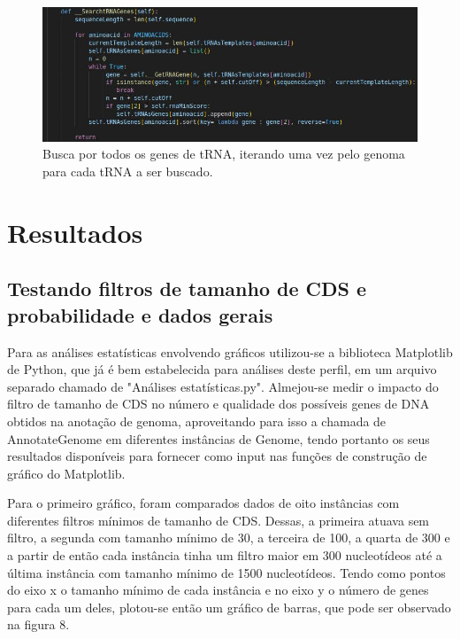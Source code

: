 \documentclass[brazilian,12pt,a4paper,final]{article}
\begin{document}
\begin{figure}[hbtp]
	\begin{center}
		\includegraphics[]{SearchtRNAGenes.jpg}
		\caption{Busca por todos os genes de tRNA, iterando uma vez pelo genoma para cada tRNA a ser buscado.}
		\label{fig}
	\end{center}
\end{figure}


	
	
	
	
	\section{Resultados}
	\vspace{0.5cm}
	\subsection{Testando filtros de tamanho de CDS e probabilidade e dados gerais }
	Para as análises estatísticas envolvendo gráficos utilizou-se a biblioteca Matplotlib de Python, que já é bem estabelecida para análises deste perfil, em um arquivo separado chamado de "Análises estatísticas.py". Almejou-se medir o impacto do filtro de tamanho de CDS no número e qualidade dos possíveis genes de DNA obtidos na anotação de genoma, aproveitando para isso a chamada de AnnotateGenome em diferentes instâncias de Genome, tendo portanto os seus resultados disponíveis para fornecer como input nas funções de construção de gráfico do Matplotlib. 
	
	Para o primeiro gráfico, foram comparados dados de oito instâncias com diferentes filtros mínimos de tamanho de CDS. Dessas, a primeira atuava sem filtro, a segunda com tamanho mínimo de 30, a terceira de 100, a quarta de 300 e a partir de então cada instância tinha um filtro maior em 300 nucleotídeos até a última instância com tamanho mínimo de 1500 nucleotídeos.
	Tendo como pontos do eixo x o tamanho mínimo de cada instância e no eixo y o número de genes para cada um deles, plotou-se então um gráfico de barras, que pode ser observado na figura 8.
	
\end{document}

